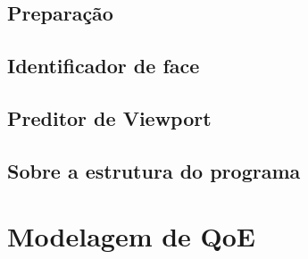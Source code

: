 \subsection{Preparação}
\subsection{Identificador de face}
\subsection{Preditor de Viewport}
\subsection{Sobre a estrutura do programa}

\section{Modelagem de QoE}
